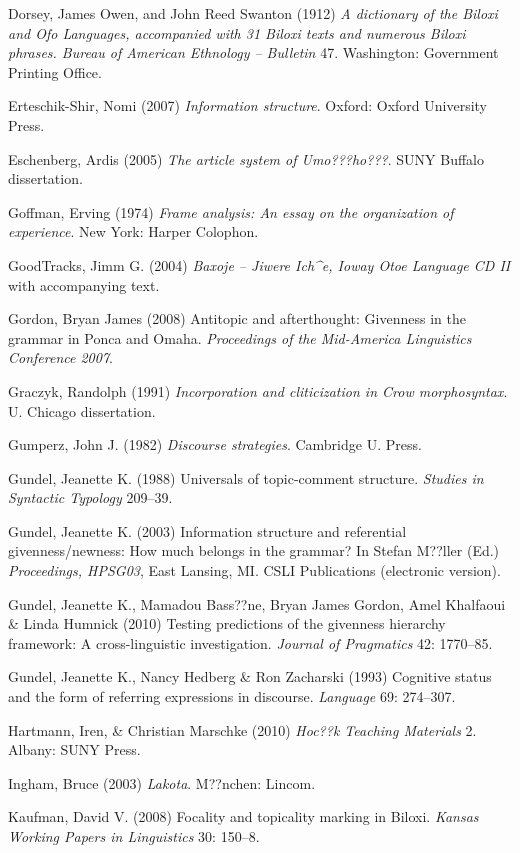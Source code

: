 \documentclass[output=paper]{LSP/langsci}
\begin{document}
\begin{reflist}
Dorsey, James Owen, and John Reed Swanton (1912) \emph{A dictionary of the Biloxi and Ofo Languages, accompanied with 31 Biloxi texts and numerous Biloxi phrases. Bureau of American Ethnology -- Bulletin} 47. Washington: Government Printing Office.

Erteschik-Shir, Nomi (2007) \emph{Information structure}. Oxford: Oxford University Press.

Eschenberg, Ardis (2005) \emph{The article system of Umo???ho???}. SUNY Buffalo dissertation.

Goffman, Erving (1974) \emph{Frame analysis: An essay on the organization of experience}. New York: Harper Colophon.

GoodTracks, Jimm G. (2004) \emph{Baxoje -- Jiwere Ich\^{}e, Ioway Otoe Language CD II} with accompanying text.

Gordon, Bryan James (2008) Antitopic and afterthought: Givenness in the grammar in Ponca and Omaha. \emph{Proceedings of the Mid-America Linguistics Conference 2007}.

Graczyk, Randolph (1991) \emph{Incorporation and cliticization in Crow morphosyntax}. U. Chicago dissertation.

Gumperz, John J. (1982) \emph{Discourse strategies}. Cambridge U. Press.

Gundel, Jeanette K. (1988) Universals of topic-comment structure. \emph{Studies in Syntactic Typology} 209--39.

Gundel, Jeanette K. (2003) Information structure and referential givenness/newness: How much belongs in the grammar? In Stefan M??ller (Ed.) \emph{Proceedings, HPSG03}, East Lansing, MI. CSLI Publications (electronic version).

Gundel, Jeanette K., Mamadou Bass??ne, Bryan James Gordon, Amel Khalfaoui \& Linda Humnick (2010) Testing predictions of the givenness hierarchy framework: A cross-linguistic investigation. \emph{Journal of Pragmatics} 42: 1770--85.

Gundel, Jeanette K., Nancy Hedberg \& Ron Zacharski (1993) Cognitive status and the form of referring expressions in discourse. \emph{Language} 69: 274--307.

Hartmann, Iren, \& Christian Marschke (2010) \emph{Hoc??k Teaching Materials} 2. Albany: SUNY Press.

Ingham, Bruce (2003) \emph{Lakota}. M??nchen: Lincom.

Kaufman, David V. (2008) Focality and topicality marking in Biloxi. \emph{Kansas Working Papers in Linguistics} 30: 150--8.


\end{reflist}
\end{document}
